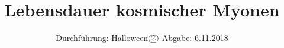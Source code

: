 

\subject{V01}
\title{Lebensdauer kosmischer Myonen}
\date{%
  Durchführung: Halloween\;$\bigpumpkin$
  \hspace{3em}
  Abgabe: 6.11.2018
}



\maketitle
\thispagestyle{empty}
\tableofcontents
\newpage


%



\printbibliography


